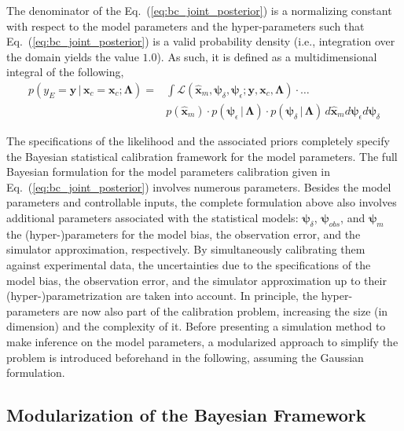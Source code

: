 The denominator of the Eq.~(\ref{eq:bc_joint_posterior}) is a normalizing constant with respect to the model parameters and the hyper-parameters such that Eq.~(\ref{eq:bc_joint_posterior}) is a valid probability density (i.e., integration over the domain yields the value $1.0$).
As such, it is defined as a multidimensional integral of the following,
\begin{equation}
	\begin{split}
	p(y_E = \mathbf{y} \,|\, \bm{x}_c = \mathbf{x}_c ; \bm{\Lambda}) = & \int \mathcal{L}(\hat{\bm{x}}_m,\bm{\psi}_\delta, \bm{\psi}_\epsilon ;  \mathbf{y}, \mathbf{x}_c, \bm{\Lambda}) \cdot \ldots \\
	& p(\hat{\bm{x}}_m) \cdot p(\bm{\psi}_\epsilon\,|\,\bm{\Lambda}) \cdot p(\bm{\psi}_\delta\,|\,\bm{\Lambda}) \, d\hat{\bm{x}}_m d\bm{\psi}_\epsilon d\bm{\psi}_\delta
	\end{split}
\label{eq:bc_normalizing_constant}
\end{equation}

The specifications of the likelihood and the associated priors completely specify the Bayesian statistical calibration framework for the model parameters.
The full Bayesian formulation for the model parameters calibration given in Eq.~(\ref{eq:bc_joint_posterior}) involves numerous parameters.
Besides the model parameters and controllable inputs, the complete formulation above also involves additional parameters associated with the statistical models: $\bm{\psi}_\delta$, $\bm{\psi}_{obs}$, and $\bm{\psi}_m$ the (hyper-)para\-meters for the model bias, the observation error, and the simulator approximation, respectively.
By simultaneously calibrating them against experimental data,
the uncertainties due to the specifications of the model bias, the observation error, and the simulator approximation up to their (hyper-)parametrization are taken into account.
In principle, the hyper-parameters are now also part of the calibration problem, increasing the size (in dimension) and the complexity of it.
Before presenting a simulation method to make inference on the model parameters, 
a modularized approach \cite{Liu2005} to simplify the problem is introduced beforehand in the following, assuming the Gaussian formulation.

\subsection{Modularization of the Bayesian Framework}\label{sub:bc_modularization}


